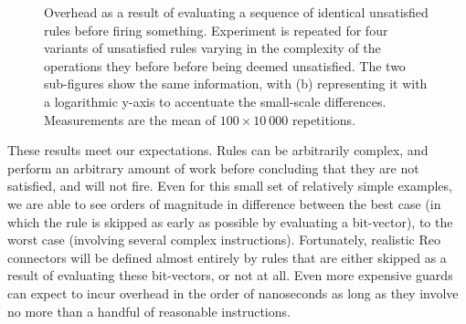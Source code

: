 \begin{figure}
{\begin{subfigure}[b]{0.63\textwidth}
			\caption{}
			\label{fig:check_time_2}
		\end{subfigure}%
	}
	\caption[Overhead of evaluating unsatisfied rules.]{Overhead as a result of evaluating a sequence of identical unsatisfied rules before firing something. Experiment is repeated for four variants of unsatisfied rules varying in the complexity of the operations they before before being deemed unsatisfied. The two sub-figures show the same information, with (b) representing it with a logarithmic y-axis to accentuate the small-scale differences. Measurements are the mean of $100\times{}10~000$ repetitions.}
	\label{fig:check_time}
\end{figure}

These results meet our expectations. Rules can be arbitrarily complex, and perform an arbitrary amount of work before concluding that they are not satisfied, and will not fire. Even for this small set of relatively simple examples, we are able to see orders of magnitude in difference between the best case (in which the rule is skipped as early as possible by evaluating a bit-vector), to the worst case (involving several complex instructions). Fortunately, realistic Reo connectors will be defined almost entirely by rules that are either skipped as a result of evaluating these bit-vectors, or not at all. Even more expensive guards can expect to incur overhead in the order of nanoseconds as long as they involve no more than a handful of reasonable instructions. 

